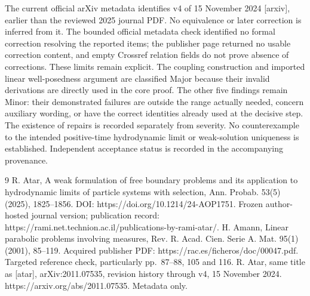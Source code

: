 \documentclass[10pt]{article}
\begin{document}
The current official arXiv metadata identifies v4 of 15 November 2024 [arxiv], earlier than the reviewed 2025 journal PDF. No equivalence or later correction is inferred from it. The bounded official metadata check identified no formal correction resolving the reported items; the publisher page returned no usable correction content, and empty Crossref relation fields do not prove absence of corrections. These limits remain explicit. The coupling construction and imported linear well-posedness argument are classified Major because their invalid derivations are directly used in the core proof. The other five findings remain Minor: their demonstrated failures are outside the range actually needed, concern auxiliary wording, or have the correct identities already used at the decisive step. The existence of repairs is recorded separately from severity. No counterexample to the intended positive-time hydrodynamic limit or weak-solution uniqueness is established. Independent acceptance status is recorded in the accompanying provenance.\par
9 R. Atar, A weak formulation of free boundary problems and its application to hydrodynamic limits of particle systems with selection, Ann. Probab. 53(5) (2025), 1825–1856. DOI: https://doi.org/10.1214/24-AOP1751. Frozen author-hosted journal version; publication record: https://rami.net.technion.ac.il/publications-by-rami-atar/. H. Amann, Linear parabolic problems involving measures, Rev. R. Acad. Cien. Serie A. Mat. 95(1) (2001), 85–119. Acquired publisher PDF: https://rac.es/ficheros/doc/00047.pdf. Targeted reference check, particularly pp. 87–88, 105 and 116. R. Atar, same title as [atar], arXiv:2011.07535, revision history through v4, 15 November 2024. https://arxiv.org/abs/2011.07535. Metadata only.\par
\end{document}
